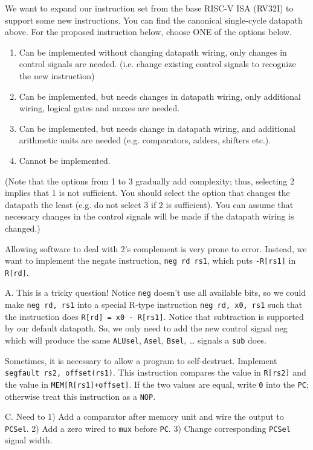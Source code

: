 \begin{blocksection}
\question
We want to expand our instruction set from the base RISC-­V ISA (RV32I) to support some new instructions. You can find the canonical single-cycle datapath above. For the proposed instruction below, choose ONE of the options below.

\begin{enumerate}
    \item Can be implemented without changing datapath wiring, only changes in control signals are needed. (i.e. change existing control signals to recognize the new instruction)
    \item Can be implemented, but needs changes in datapath wiring, only additional wiring, logical gates and muxes are needed.
    \item Can be implemented, but needs change in datapath wiring, and additional arithmetic units are needed (e.g. comparators, adders, shifters etc.).
    \item Cannot be implemented.
\end{enumerate}

(Note that the options from 1 to 3 gradually add complexity; thus, selecting 2 implies that 1 is not sufficient. You should select the option that changes the datapath the least (e.g. do not select 3 if 2 is sufficient). You can assume that necessary changes in the control signals will be made if the datapath wiring is changed.)

\begin{parts}

\item Allowing software to deal with 2’s complement is very prone to error. Instead, we want to implement the negate instruction, \texttt{neg rd rs1}, which puts \texttt{-R[rs1]} in \texttt{R[rd]}.

\begin{solution}[0.5in]
A. This is a tricky question! Notice \texttt{neg} doesn’t use all available bits, so we could make \texttt{neg rd, rs1} into a special R-type instruction \texttt{neg rd, x0, rs1} such that the instruction does \texttt{R[rd] = x0 - R[rs1]}. Notice that subtraction is supported by our default datapath. So, we only need to add the new control signal neg which will produce the same \texttt{ALUsel}, \texttt{Asel}, \texttt{Bsel}, … signals a \texttt{sub} does.
\end{solution}

\item Sometimes, it is necessary to allow a program to self­-destruct. Implement \texttt{segfault rs2, offset(rs1)}. This instruction compares the value in \texttt{R[rs2]} and the value in \texttt{MEM[R[rs1]+offset]}. If the two values are equal, write \texttt{0} into the \texttt{PC}; otherwise treat this instruction as a \texttt{NOP}.

\begin{solution}[0.5in]
 C. Need to 1) Add a comparator after memory unit and wire the output to \texttt{PCSel}. 2) Add a zero wired to \texttt{mux} before \texttt{PC}. 3) Change corresponding \texttt{PCSel} signal width.
\end{solution}
\end{parts}

\end{blocksection}